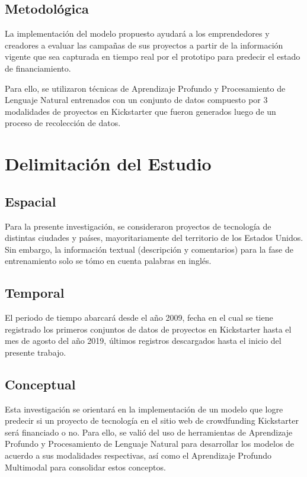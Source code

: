 \subsection{Metodológica}
La implementación del modelo propuesto ayudará a los emprendedores y creadores a evaluar las campañas de sus proyectos a partir de la información vigente que sea capturada en tiempo real por el prototipo para predecir el estado de financiamiento.

Para ello, se utilizaron técnicas de Aprendizaje Profundo y Procesamiento de Lenguaje Natural entrenados con un conjunto de datos compuesto por 3 modalidades de proyectos en Kickstarter que fueron generados luego de un proceso de recolección de datos.

\section{Delimitación del Estudio}

\subsection{Espacial}
Para la presente investigación, se consideraron proyectos de tecnología de distintas ciudades y países, mayoritariamente del territorio de los Estados Unidos. Sin embargo, la información textual (descripción y comentarios) para la fase de entrenamiento solo se tómo en cuenta palabras en inglés.

\subsection{Temporal}
El periodo de tiempo abarcará desde el año 2009, fecha en el cual se tiene registrado los primeros conjuntos de datos de proyectos en Kickstarter hasta el mes de agosto del año 2019, últimos registros descargados hasta el inicio del presente trabajo.

\subsection{Conceptual}
Esta investigación se orientará en la implementación de un modelo que logre predecir si un proyecto de tecnología en el sitio web de crowdfunding Kickstarter será financiado o no. Para ello, se valió del uso de herramientas de Aprendizaje Profundo y Procesamiento de Lenguaje Natural para desarrollar los modelos de acuerdo a sus modalidades respectivas, así como el Aprendizaje Profundo Multimodal para consolidar estos conceptos.
